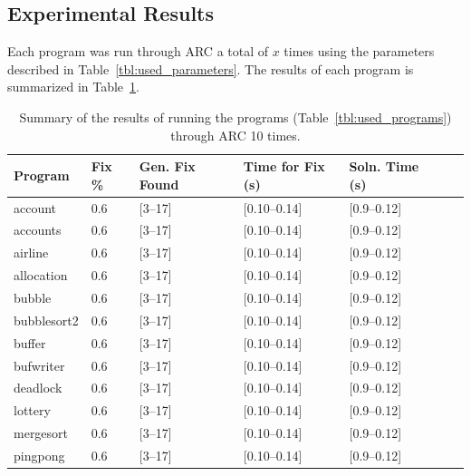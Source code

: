 \documentclass{llncs}
\begin{document}
\subsection{Experimental Results}
\label{sec:experimental_results}

Each program was run through ARC a total of $x$ times using the parameters
described in Table~\ref{tbl:used_parameters}. The results of each program is
summarized in Table~\ref{tbl:summary_results}.


\begin{table}%
\caption{Summary of the results of running the programs
(Table~\ref{tbl:used_programs}) through ARC 10 times.}
\begin{center}
\lstset{basicstyle=\scriptsize}
\begin{tabular}{|p{1.8cm}|p{1.5cm}|p{1.75cm}|p{1.75cm}|p{1.75cm}|p{2cm}|p{2cm}|}
\hline
\textbf{Program} & \textbf{Fix \%} & \textbf{Gen. Fix Found} & \textbf{Time for Fix (s)} & \textbf{Soln. Time (s)}  \\
\hline
account & 0.6 & [3--17] & [0.10--0.14] & [0.9--0.12] \\
\hline
accounts & 0.6 & [3--17] & [0.10--0.14] & [0.9--0.12] \\
\hline
airline & 0.6 & [3--17] & [0.10--0.14] & [0.9--0.12] \\
\hline
allocation & 0.6 & [3--17] & [0.10--0.14] & [0.9--0.12] \\
\hline
bubble & 0.6 & [3--17] & [0.10--0.14] & [0.9--0.12] \\
\hline
bubblesort2 & 0.6 & [3--17] & [0.10--0.14] & [0.9--0.12] \\
\hline
buffer & 0.6 & [3--17] & [0.10--0.14] & [0.9--0.12] \\
\hline
bufwriter & 0.6 & [3--17] & [0.10--0.14] & [0.9--0.12] \\
\hline
deadlock & 0.6 & [3--17] & [0.10--0.14] & [0.9--0.12] \\
\hline
lottery & 0.6 & [3--17] & [0.10--0.14] & [0.9--0.12] \\
\hline
mergesort & 0.6 & [3--17] & [0.10--0.14] & [0.9--0.12] \\
\hline
pingpong & 0.6 & [3--17] & [0.10--0.14] & [0.9--0.12] \\
\hline
\end{tabular}
\label{tbl:summary_results}
\end{center}
\end{table}
\end{document}
